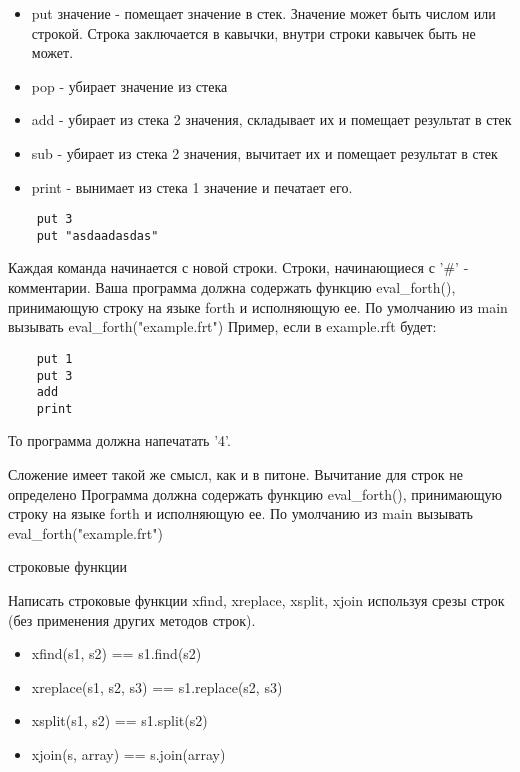 \documentclass{article}
\begin{document}
\begin{itemize}
    \item put значение - помещает значение в стек. Значение может
          быть числом или строкой. Строка заключается в кавычки, внутри
          строки кавычек быть не может.
    \item pop - убирает значение из стека
    \item add - убирает из стека 2 значения, складывает их и помещает результат в стек
    \item sub - убирает из стека 2 значения, вычитает их и помещает результат в стек
    \item print - вынимает из стека 1 значение и печатает его.
\end{itemize}


\begin{lstlisting}
    put 3
    put "asdaadasdas"
\end{lstlisting}

    Каждая команда начинается с новой строки. Строки, начинающиеся с '\#' - комментарии.
    Ваша программа должна содержать функцию eval\_forth(), принимающую строку на языке
    forth и исполняющую ее. По умолчанию из main вызывать eval\_forth("example.frt")
    Пример, если в example.rft будет:

\begin{lstlisting}
    put 1
    put 3
    add
    print
\end{lstlisting}

    То программа должна напечатать '4'. 

    Сложение имеет такой же смысл, как и в питоне. Вычитание для строк не определено
    Программа должна содержать функцию eval\_forth(), принимающую строку на языке forth и исполняющую ее. 
    По умолчанию из main вызывать eval\_forth("example.frt")
\newpage

\begin{center} строковые функции \end{center}
Написать строковые функции xfind, xreplace, xsplit, xjoin используя
срезы строк (без применения других методов строк).
\begin{itemize}
    \item xfind(s1, s2) == s1.find(s2)
    \item xreplace(s1, s2, s3) == s1.replace(s2, s3)
    \item xsplit(s1, s2) == s1.split(s2)
    \item xjoin(s, array) == s.join(array)
\end{itemize}
\newpage
\end{document}
